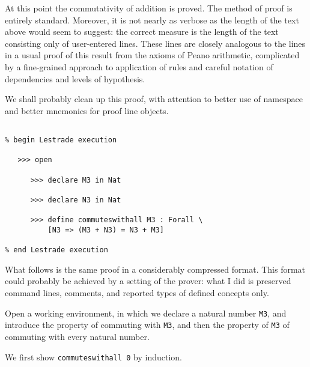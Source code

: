 \documentclass[12pt]{article}
\begin{document}
At this point the commutativity of addition is proved.  The method of proof is entirely standard.  Moreover, it is not nearly as verbose as the length of the text above would seem to suggest:  the correct measure is the length of the text consisting only of user-entered lines.  These lines are closely analogous to the lines in a usual proof of this result from the axioms of Peano arithmetic, complicated by a fine-grained approach to application of rules and careful notation of dependencies and levels of hypothesis.

We shall probably clean up this proof, with attention to better use of namespace and better mnemonics for proof line objects.

\begin{verbatim}

% begin Lestrade execution

   >>> open

      >>> declare M3 in Nat

      >>> declare N3 in Nat

      >>> define commuteswithall M3 : Forall \
          [N3 => (M3 + N3) = N3 + M3]

% end Lestrade execution
\end{verbatim}

What follows is the same proof in a considerably compressed format.   This format could probably be achieved by a setting of the prover:  what I did is preserved command lines,
comments, and reported types of defined concepts only.

Open a working environment, in which we declare a natural number {\tt M3}, and introduce the property of commuting with {\tt M3}, and then the property of {\tt M3} of commuting with every natural number.

We first show {\tt commuteswithall 0} by induction.
\end{document}
